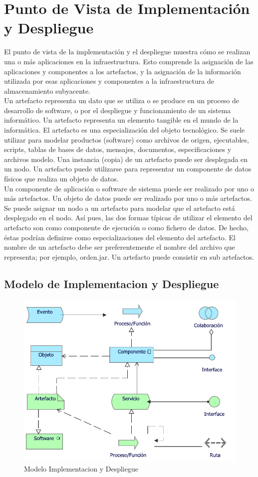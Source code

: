 \section{Punto de Vista de Implementación y Despliegue}

El punto de vista de la implementación y el despliegue muestra cómo se realizan una o más aplicaciones en la infraestructura. Esto comprende la asignación de las aplicaciones y componentes a los artefactos, y la asignación de la información utilizada por esas aplicaciones y componentes a la infraestructura de almacenamiento subyacente.\\

Un artefacto representa un dato que se utiliza o se produce en un proceso de desarrollo de software, o por el despliegue y funcionamiento de un sistema informático. Un artefacto representa un elemento tangible en el mundo de la informática. El artefacto es una especialización del objeto tecnológico. Se suele utilizar para modelar productos (software) como archivos de origen, ejecutables, scripts, tablas de bases de datos, mensajes, documentos, especificaciones y archivos modelo. Una instancia (copia) de un artefacto puede ser desplegada en un nodo. Un artefacto puede utilizarse para representar un componente de datos físicos que realiza un objeto de datos.\\

Un componente de aplicación o software de sistema puede ser realizado por uno o más artefactos. Un objeto de datos puede ser realizado por uno o más artefactos. Se puede asignar un nodo a un artefacto para modelar que el artefacto está desplegado en el nodo. Así pues, las dos formas típicas de utilizar el elemento del artefacto son como componente de ejecución o como fichero de datos. De hecho, éstas podrían definirse como especializaciones del elemento del artefacto.
El nombre de un artefacto debe ser preferentemente el nombre del archivo que representa; por ejemplo, orden.jar. Un artefacto puede consistir en sub artefactos.

\clearpage

\subsection{Modelo de Implementacion y Despliegue}
\begin{figure}[h!]
	\centering
	\includegraphics[width=.7\linewidth]{imgs/modelo/Implementacion}
	\caption{Modelo Implementacion y Despliegue}
\end{figure}

